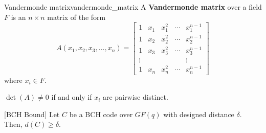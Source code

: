 \begin{Definition}{Vandermonde matrix}{vandermonde_matrix}
    A \textbf{Vandermonde matrix} over a field $ F $ is an
    $ n\times n $ matrix of the form
    \[ A\left(x_{1}, x_{2}, x_{3}, \ldots, x_{n}\right)=\left[\begin{array}{ccccc}
                1      & x_{1} & x_{1}^{2} & \cdots & x_{1}^{n-1} \\
                1      & x_{2} & x_{2}^{2} & \cdots & x_{2}^{n-1} \\
                1      & x_{3} & x_{3}^{2} & \cdots & x_{3}^{n-1} \\
                \vdots &       &           &        & \vdots      \\
                1      & x_{n} & x_{n}^{2} & \cdots & x_{n}^{n-1}
            \end{array}\right] \]
    where $ x_i\in F $.
\end{Definition}

\begin{Theorem}{}{}
    $ \det(A)\neq 0 $ if and only if $ x_i $ are pairwise distinct.
\end{Theorem}

\begin{Theorem}{}{}[BCH Bound]
    Let $ C $ be a BCH code over $ GF(q) $ with designed
    distance $ \delta $. Then, $ d(C)\geqslant \delta $.
\end{Theorem}

